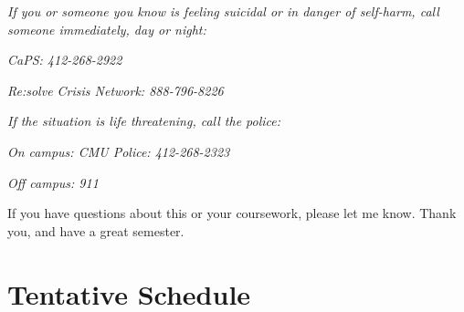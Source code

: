 \documentclass[11pt,letterpaper]{article}
\begin{document}
\medskip
\noindent
\textit{If you or someone you know is feeling suicidal or in danger of self-harm, call someone immediately, day or night:}

\textit{CaPS: 412-268-2922}

\textit{Re:solve Crisis Network: 888-796-8226}

\medskip
\noindent
\textit{If the situation is life threatening, call the police:}

\textit{On campus: CMU Police: 412-268-2323}

\textit{Off campus: 911}

\medskip
\noindent
If you have questions about this or your coursework, please let me know. Thank you, and have a great semester.


\section*{Tentative Schedule}
\end{document}
